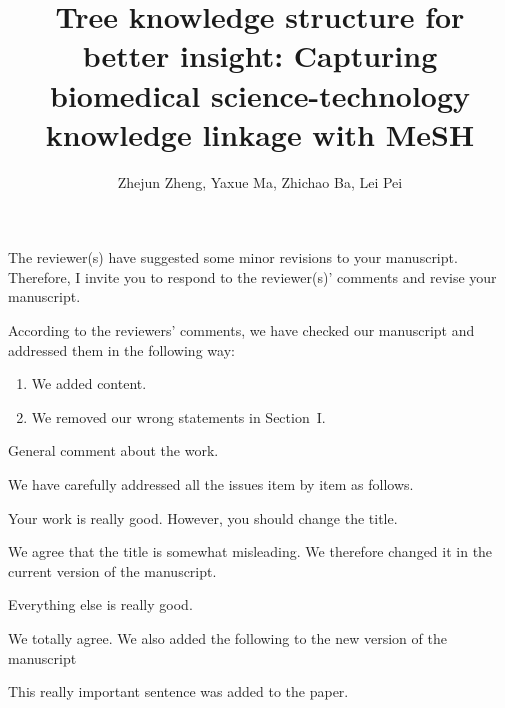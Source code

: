 \documentclass[11pt,american]{scrartcl}
\title{Tree knowledge structure for better insight: Capturing biomedical science-technology knowledge linkage with MeSH}
\author{Zhejun Zheng, Yaxue Ma, Zhichao Ba, Lei Pei}
\begin{document}

% 

\editor
\begin{generalcomment}
	The reviewer(s) have suggested some minor revisions to your manuscript. Therefore, I invite you to respond to the reviewer(s)' comments and revise your manuscript.
\end{generalcomment}
\begin{revresponse}
	According to the reviewers' comments, we have checked our manuscript and addressed them in the following way:
	\begin{enumerate}
		\item We added content.
		\item We removed our wrong statements in Section~I.
	\end{enumerate}
\end{revresponse}


\reviewer
\begin{generalcomment}
	General comment about the work.
\end{generalcomment}
\begin{revresponse}
	We have carefully addressed all the issues item by item as follows.
\end{revresponse}

\begin{revcomment}
	Your work is really good. However, you should change the title.
\end{revcomment}
\begin{revresponse}
	We agree that the title is somewhat misleading.
	We therefore changed it in the current version of the manuscript.
\end{revresponse}

\begin{revcomment}
	Everything else is really good.
\end{revcomment}
\begin{revresponse}
	We totally agree. We also added the following to the new version of the manuscript
	\begin{changes}
		This really important sentence was added to the paper.
	\end{changes}
\end{revresponse}
\end{document}
